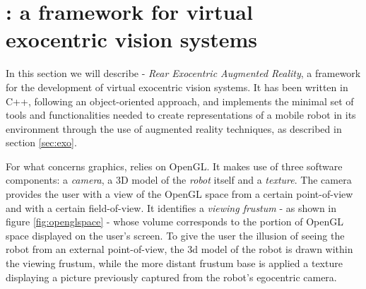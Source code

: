 \section{\framework{}: a framework for virtual exocentric vision systems}
\label{sec:rear}
In this section we will describe \framework{} - 
\textit{Rear Exocentric Augmented Reality}, a framework 
for the development of virtual exocentric vision systems.
%
It has been written in C++, following an object-oriented 
approach, and implements the minimal set of tools and functionalities 
needed to create representations of a mobile robot in its environment 
through the use of augmented reality techniques, as described in 
section \ref{sec:exo}.
%

%
For what concerns graphics, \framework{} relies on OpenGL.
It makes use of three software components: a \textit{camera}, 
a 3D model of the \textit{robot} itself and a \textit{texture}.
%
The camera provides the user with a view of the OpenGL space 
from a certain point-of-view and with a certain field-of-view. 
It identifies a \textit{viewing frustum} - as shown in figure 
\ref{fig:openglspace} - whose volume corresponds to the 
portion of OpenGL space displayed on the user's screen.
%
To give the user the illusion of seeing the robot from an 
external point-of-view, the 3d model of the robot is drawn 
within the viewing frustum, while the more distant frustum base 
is applied a texture displaying a picture previously 
captured from the robot's egocentric camera.
%

